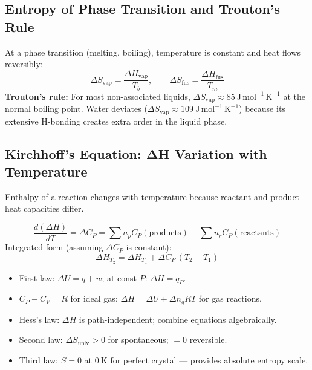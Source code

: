 \documentclass[12pt,a4paper]{article}
\begin{document}
\subsection{Entropy of Phase Transition and Trouton's Rule}
At a phase transition (melting, boiling), temperature is constant and heat flows reversibly:
\[
\Delta S_{\mathrm{vap}} = \frac{\Delta H_{\mathrm{vap}}}{T_b}, \qquad \Delta S_{\mathrm{fus}} = \frac{\Delta H_{\mathrm{fus}}}{T_m}
\]
\textbf{Trouton's rule:} For most non-associated liquids, $\Delta S_{\mathrm{vap}} \approx 85\ \mathrm{J\,mol^{-1}\,K^{-1}}$ at the normal boiling point. Water deviates ($\Delta S_{\mathrm{vap}} \approx 109\ \mathrm{J\,mol^{-1}\,K^{-1}}$) because its extensive H-bonding creates extra order in the liquid phase.

\subsection{Kirchhoff's Equation: ΔH Variation with Temperature}
Enthalpy of a reaction changes with temperature because reactant and product heat capacities differ.

\begin{tcolorbox}[formulabox, title={Kirchhoff's Equation}]
\[
\frac{d(\Delta H)}{dT} = \Delta C_P = \sum n_p C_P(\text{products}) - \sum n_r C_P(\text{reactants})
\]
Integrated form (assuming $\Delta C_P$ is constant):
\[
\Delta H_{T_2} = \Delta H_{T_1} + \Delta C_P\,(T_2 - T_1)
\]
\end{tcolorbox}

\begin{tcolorbox}[exambox, title={Exam Points (Section 1)}]
\begin{itemize}[leftmargin=*, itemsep=2pt, topsep=2pt]
  \item First law: $\Delta U = q + w$; at const $P$: $\Delta H = q_P$.
  \item $C_P - C_V = R$ for ideal gas; $\Delta H = \Delta U + \Delta n_g RT$ for gas reactions.
  \item Hess's law: $\Delta H$ is path-independent; combine equations algebraically.
  \item Second law: $\Delta S_{\mathrm{univ}} > 0$ for spontaneous; $= 0$ reversible.
  \item Third law: $S = 0$ at $0\ \mathrm{K}$ for perfect crystal — provides absolute entropy scale.
\end{itemize}
\end{tcolorbox}

\end{document}
